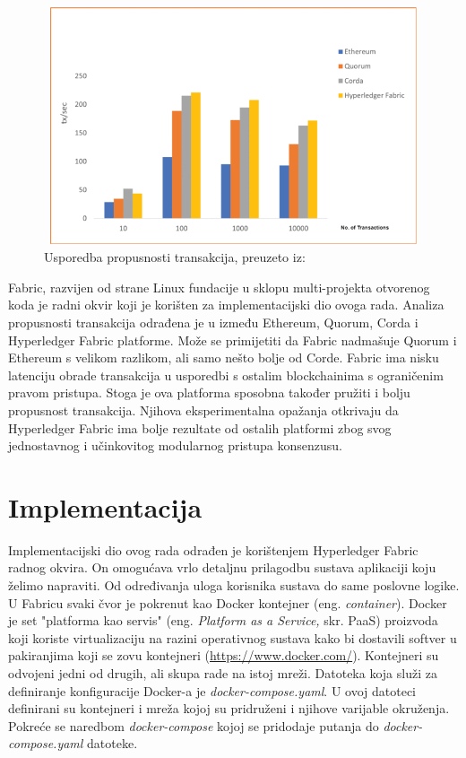 \documentclass[times, utf8, diplomski]{fer}
\begin{document}
\begin{figure}[htb]
\centering
\includegraphics[width=13cm, height=7cm]{imgs/monra10-CSDE92-large.png}
\caption{Usporedba propusnosti transakcija,  preuzeto iz: \cite{9411380}}
\label{fig:usporedba}
\end{figure}


Fabric, razvijen od strane Linux fundacije u sklopu multi-projekta otvorenog koda je radni okvir koji je korišten za implementacijski dio ovoga rada. Analiza propusnosti transakcija odrađena je u \citep{9411380} između Ethereum, Quorum, Corda i Hyperledger Fabric platforme. Može se primijetiti da Fabric nadmašuje Quorum i Ethereum s velikom razlikom, ali samo nešto bolje od Corde. Fabric ima nisku latenciju obrade transakcija u usporedbi s ostalim blockchainima s ograničenim pravom pristupa. Stoga je ova platforma sposobna također pružiti i bolju propusnost transakcija. Njihova eksperimentalna opažanja otkrivaju da Hyperledger Fabric ima bolje rezultate od ostalih platformi zbog svog jednostavnog i učinkovitog modularnog pristupa konsenzusu.

\chapter{Implementacija}
Implementacijski dio ovog rada odrađen je korištenjem Hyperledger Fabric radnog okvira.  On omogućava vrlo detaljnu prilagodbu sustava aplikaciji koju želimo napraviti.  Od određivanja uloga korisnika sustava do same poslovne logike. U Fabricu svaki čvor je pokrenut kao Docker kontejner (eng. \textit{container}). Docker je set "platforma kao servis" (eng. \textit{Platform as a Service,} skr. PaaS) proizvoda koji koriste virtualizaciju na razini operativnog sustava kako bi dostavili softver u pakiranjima koji se zovu kontejneri (\url{https://www.docker.com/}).  Kontejneri su odvojeni jedni od drugih, ali skupa rade na istoj mreži. Datoteka koja služi za definiranje konfiguracije Docker-a je \textit{docker-compose.yaml}. U ovoj datoteci definirani su kontejneri i mreža kojoj su pridruženi i njihove varijable okruženja. Pokreće se naredbom \textit{docker-compose} kojoj se pridodaje putanja do \textit{docker-compose.yaml} datoteke.
\end{document}
